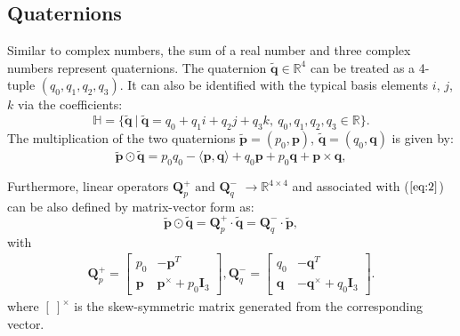 \documentclass[micromachines,article,accept,pdftex,moreauthors]{Definitions/mdpi}
\begin{document}

\subsection{Quaternions} \label{2.1}
Similar to complex numbers, the sum of a real number and three complex numbers represent quaternions. The quaternion $\widetilde{\boldsymbol{q}} \in \mathbb{R}^4$ can be treated as a 4-tuple $(q_0, q_1, q_2, q_3) $. It can also be identified with the typical basis elements $i$, $j$, $k$ via the coefficients:
\begin{equation} \label{eq:1}
    \mathbb{H} ={\{} \widetilde{\boldsymbol{q}}{\ }|{\ }\widetilde{\boldsymbol{q}} = q_0 + q_1 i + q_2 j + q_3 k, {\ } {q_0,q_1,q_2,q_3 \in \mathbb{R}}  {\}}.
\end{equation}
The multiplication of the two quaternions $\widetilde{\boldsymbol{p}} = (p_0, \boldsymbol{p})$, $\widetilde{\boldsymbol{q}} = (q_0, \boldsymbol{q})$ is given by:
\begin{equation} \label{eq:2}
    \widetilde{\boldsymbol{p}} \odot \widetilde{\boldsymbol{q}}=p_{0} q_{0}- {\langle\boldsymbol{p}, \boldsymbol{q}\rangle} +q_{0} \boldsymbol{p}+p_{0} \boldsymbol{q}+\boldsymbol{p} \times \boldsymbol{q},
\end{equation}

Furthermore, linear operators \cite{fanDecentralizedRecursiveIdentification2017} $\boldsymbol{Q}_{p}^{+} \text{ and } \boldsymbol{Q}_{q}^{-}$ $\rightarrow \mathbb{R}^{4 \times 4}$ and associated with ($\ref{eq:2}$) can be also defined by matrix-vector form as:
\begin{equation} \label{eq:3}
    \widetilde{\boldsymbol{p}} \odot \widetilde{\boldsymbol{q}}=\boldsymbol{Q}_{p}^{+} \cdot \widetilde{\boldsymbol{q}} = \boldsymbol{Q}_{q}^{-} \cdot \widetilde{\boldsymbol{p}},
\end{equation}
with
\begin{align*}
    \boldsymbol{Q}_{p}^{+} = 
    \left[\begin{array}{cc}
        p_{0} & -\boldsymbol{p}^{T} \\
        \boldsymbol{p} & \boldsymbol{p}^{\times}+p_{0} \boldsymbol{I}_{3}
        \end{array}\right],\boldsymbol{Q}_{q}^{-} = 
    \left[\begin{array}{cc}
        q_{0} & -\boldsymbol{q}^{T} \\
        \boldsymbol{q} & -\boldsymbol{q}^{\times}+q_{0} \boldsymbol{I}_{3}
    \end{array}\right] .
\end{align*}
where $[\ ]^{\times}$ is the skew-symmetric matrix generated from the corresponding vector.
\end{document}
